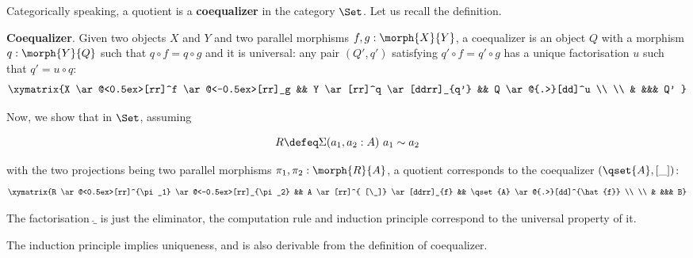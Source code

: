 Categorically speaking, a quotient is a \textbf{coequalizer} in the category $\Set$. Let us recall the definition.


\begin{definition}
\textbf{Coequalizer}.
Given two objects $X$ and $Y$ and two parallel morphisms $f, g : \morph{X}{Y}$, a coequalizer is an object $Q$ with a morphism $q : \morph{Y}{Q}$ such that $q \circ f = q \circ g$ and it is universal: any pair $(Q' , q')$ satisfying $q' \circ f = q' \circ g$ has a unique factorisation $u$ such that $q' = u \circ q$:
\begin{displaymath}
    \xymatrix{X \ar@<0.5ex>[rr]^f \ar@<-0.5ex>[rr]_g && Y \ar[rr]^q
      \ar[ddrr]_{q'} && Q
      \ar@{.>}[dd]^u \\ \\
& &&& Q' }
\end{displaymath}
\end{definition}


Now, we show that in $\Set$, assuming

$$R \defeq \Sigma (a_1,a_2 : A) ~ a_1 \sim a_2$$


with the two projections being two parallel morphisms $\pi_1,\pi_2 : \morph{R}{A}$,
a quotient corresponds to the coequalizer $(\qset{A},[\_])$:
\begin{displaymath}
    \xymatrix{R \ar@<0.5ex>[rr]^{\pi_1} \ar@<-0.5ex>[rr]_{\pi_2} && A \ar[rr]^{ [\_]}
      \ar[ddrr]_{f} && \qset{A}
      \ar@{.>}[dd]^{\hat{f}} \\ \\
& &&& B}
\end{displaymath}

The factorisation $\hat{\_}$ is just the eliminator, the computation rule and induction principle correspond to the universal property of it. 

\begin{proposition}
The induction principle implies uniqueness, and is also derivable from the definition of coequalizer.
\end{proposition}

